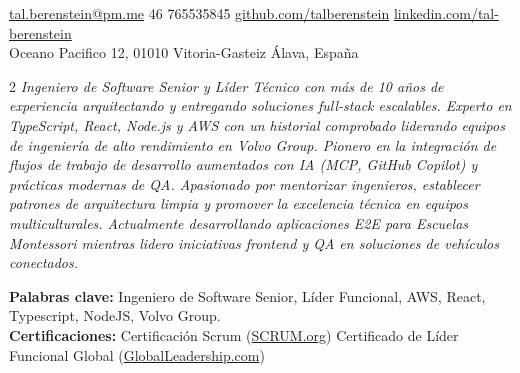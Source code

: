 \documentclass[10pt,a4paper]{article}
\begin{document}
\sloppy  %



\nobreakvspace{0.3em}  %

\noindent\href{mailto:tal.berenstein@pm.me}{tal.berenstein\mbox{}@\mbox{}pm.me}\sbull
\textsmaller{+}46 765535845\sbull
\href{https://github.com/talberenstein}{github.com/talberenstein}\sbull
\href{https://www.linkedin.com/in/tali-berenstein-torres-94055726b/}{linkedin.com/tal-berenstein}
\\
Oceano Pacifico 12,
01010\thinspace {\large \sc }\sbull
Vitoria-Gasteiz\sbull
Álava, España

\spacedhrule{0.9em}{-0.4em}  %


\vspace{-1.3em}  %
\begin{multicols}{2}  %
\noindent
\emph{Ingeniero de Software Senior y Líder Técnico con más de 10 años de experiencia arquitectando y entregando soluciones full-stack escalables. Experto en TypeScript, React, Node.js y AWS con un historial comprobado liderando equipos de ingeniería de alto rendimiento en Volvo Group. Pionero en la integración de flujos de trabajo de desarrollo aumentados con IA (MCP, GitHub Copilot) y prácticas modernas de QA. Apasionado por mentorizar ingenieros, establecer patrones de arquitectura limpia y promover la excelencia técnica en equipos multiculturales. Actualmente desarrollando aplicaciones E2E para Escuelas Montessori mientras lidero iniciativas frontend y QA en soluciones de vehículos conectados.}

\columnbreak

\end{multicols}

\noindent
\textbf{Palabras clave:}
Ingeniero de Software Senior,
Líder Funcional,
AWS,
React,
Typescript,
NodeJS,
Volvo Group.
\\
\textbf{Certificaciones:}
Certificación Scrum (\href{https://scrum.org}{SCRUM.org})
Certificado de Líder Funcional Global (\href{https://globalleadership.com}{GlobalLeadership.com})
\end{document}
